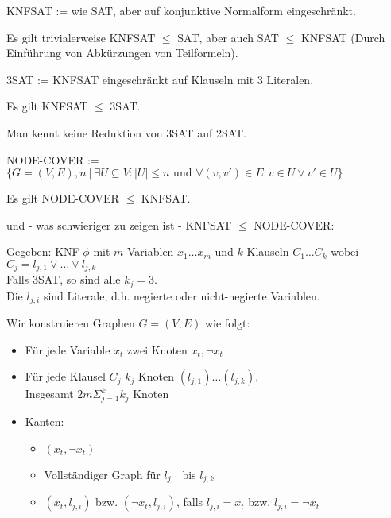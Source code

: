 \begin{beispiel}
    
    KNFSAT := wie SAT, aber auf konjunktive Normalform eingeschränkt.

    Es gilt trivialerweise KNFSAT $\leq$ SAT, aber auch SAT $\leq$ KNFSAT (Durch Einführung von Abkürzungen von Teilformeln).

\end{beispiel}

\begin{beispiel}
    
    3SAT := KNFSAT eingeschränkt auf Klauseln mit 3 Literalen.

    Es gilt KNFSAT $\leq$ 3SAT.

    Man kennt keine Reduktion von 3SAT auf 2SAT.

\end{beispiel}


\begin{beispiel}
    
    NODE-COVER := $\{ G = (V,E), n\ |\ \exists U \subseteq V: |U| \leq n \text{ und } \forall (v,v') \in E: v \in U \lor v' \in U \}$

    Es gilt NODE-COVER $\leq$ KNFSAT.

    und - was schwieriger zu zeigen ist - KNFSAT $\leq$ NODE-COVER:

    Gegeben: KNF $\phi$ mit $m$ Variablen $x_1 \dots x_m$ und $k$ Klauseln $C_1 \dots C_k$ wobei $C_j = l_{j,1} \lor \dots \lor l_{j,k}$\\
    Falls 3SAT, so sind alle $k_j = 3$.\\
    Die $l_{j,i}$ sind Literale, d.h. negierte oder nicht-negierte Variablen.

    Wir konstruieren Graphen $G = (V,E)$ wie folgt:
    \begin{itemize}
        \item Für jede Variable $x_t$ zwei Knoten $x_t, \neg x_t$
        \item Für jede Klausel $C_j$ $k_j$ Knoten $(l_{j,1}) \dots (l_{j,k})$,\\ Insgesamt $2m \Sigma_{j=1}^k k_j$ Knoten
        \item Kanten: 
        \begin{itemize}
            \item $(x_t, \neg x_t)$
            \item Vollständiger Graph für $l_{j,1} \text{ bis } l_{j,k}$
            \item $(x_t, l_{j,i})$ bzw. $(\neg x_t, l_{j,i})$, falls $l_{j,i} = x_t$ bzw. $l_{j,i} = \neg x_t$
        \end{itemize}
    \end{itemize}

\end{beispiel}





